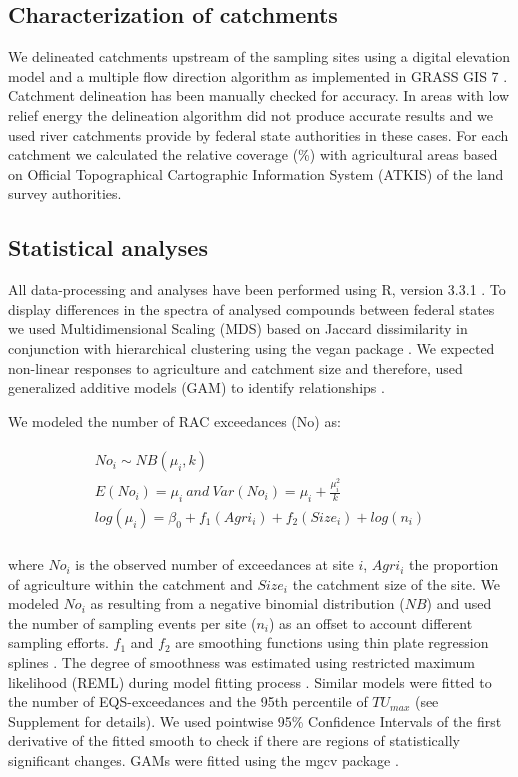 \documentclass[journal=esthag,manuscript=article]{achemso}
\begin{document}
\subsection{Characterization of catchments}
We delineated catchments upstream of the sampling sites using a digital elevation model \citep{eea_digital_2013} and a multiple flow direction algorithm \citep{holmgren_multiple_1994} as implemented in GRASS GIS 7 \citep{neteler_grass_2012}.
Catchment delineation has been manually checked for accuracy. 
In areas with low relief energy the delineation algorithm did not produce accurate results and we used river catchments provide by federal state authorities in these cases.
For each catchment we calculated the relative coverage (\%) with agricultural areas based on Official Topographical Cartographic Information System (ATKIS) of the land survey authorities.


\subsection{Statistical analyses}

All data-processing and analyses have been performed using R, version 3.3.1 \citep{r_core_team_r:_2016}.
To display differences in the spectra of analysed compounds between federal states we used Multidimensional Scaling (MDS) based on Jaccard dissimilarity in conjunction with hierarchical clustering using the vegan package \citep{oksanen_vegan:_2016}.
We expected non-linear responses to agriculture and catchment size and therefore, used generalized additive models (GAM) to identify relationships \citep{fewster_analysis_2000}.

We modeled the number of RAC exceedances (No) as:

\begin{align}
\begin{split}
  No_i \sim NB(\mu_i, k) \\
  E(No_i) = \mu_i~and~Var(No_i) = \mu_i + \frac{\mu_i^2}{k} \\
  log(\mu_i)= \beta_0 + f_1(Agri_i) + f_2(Size_i) + log(n_i) \\
\end{split}
\end{align}

where $No_i$ is the observed number of exceedances at site $i$, $Agri_i$ the proportion of agriculture within the catchment and $Size_i$ the catchment size of the site. 
We modeled $No_i$ as resulting from a negative binomial distribution ($NB$) and used the number of sampling events per site ($n_i$) as an offset to account different sampling efforts. 
$f_1$ and $f_2$ are smoothing functions using thin plate regression splines \citep{wood_thin_2003}.
The degree of smoothness was estimated using restricted maximum likelihood (REML) during model fitting process \citep{wood_fast_2011}.
Similar models were fitted to the number of EQS-exceedances and the 95th percentile of $TU_{max}$ (see Supplement for details). 
We used pointwise 95\% Confidence Intervals of the first derivative of the fitted smooth to check if there are regions of statistically significant changes.
GAMs were fitted using the mgcv package \citep{wood_fast_2011}.
\end{document}
